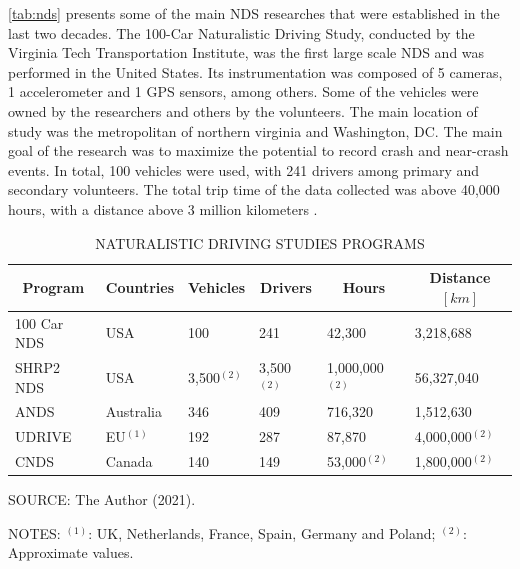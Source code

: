 
\autoref{tab:nds} presents some of the main NDS researches that were established in the last two decades. The 100-Car Naturalistic Driving Study, conducted by the Virginia Tech Transportation Institute, was the first large scale NDS and was performed in the United States. Its instrumentation was composed of 5 cameras, 1 accelerometer and 1 GPS sensors, among others. Some of the vehicles were owned by the researchers and others by the volunteers. The main location of study was the metropolitan of northern virginia and Washington, DC. The main goal of the research was to maximize the potential to record crash and near-crash events. In total, 100 vehicles were used, with 241 drivers among primary and secondary volunteers. The total trip time of the data collected was above 40,000 hours, with a distance above 3 million kilometers \cite{Neale2005}.

\begin{table}[!hbtp]
    \footnotesize
    \captionsetup{justification=raggedright,
        singlelinecheck=false,
        font=footnotesize}
    \caption{NATURALISTIC DRIVING STUDIES PROGRAMS}
    \centering
    \begin{tabular}{llllll}
        \hline
        \multicolumn{1}{c}{\textbf{Program}} & \multicolumn{1}{c}{\textbf{Countries}} & \multicolumn{1}{c}{\textbf{Vehicles}} & \multicolumn{1}{c}{\textbf{Drivers}} & \multicolumn{1}{c}{\textbf{Hours}} & \multicolumn{1}{c}{\textbf{Distance}$[km]$} \\
        \hline
        100 Car NDS & USA & 100 & 241 & 42,300 & 3,218,688 \\
        SHRP2 NDS & USA & 3,500$^{(2)}$ & 3,500$^{(2)}$ & 1,000,000$^{(2)}$ & 56,327,040 \\
        ANDS & Australia & 346 & 409 & 716,320 & 1,512,630 \\
        UDRIVE & EU$^{(1)}$ & 192 & 287 & 87,870 & 4,000,000$^{(2)}$ \\
        CNDS & Canada & 140 & 149 & 53,000$^{(2)}$ & 1,800,000$^{(2)}$ \\ 
        \hline
    \end{tabular}
    \label{tab:nds}
    \par \vspace{2mm} \footnotesize \raggedright
    SOURCE: The Author (2021).
    \par \vspace{1mm} \footnotesize \raggedright
    NOTES: $^{(1)}$: UK, Netherlands, France, Spain, Germany and Poland; $^{(2)}$: Approximate values.
\end{table}

